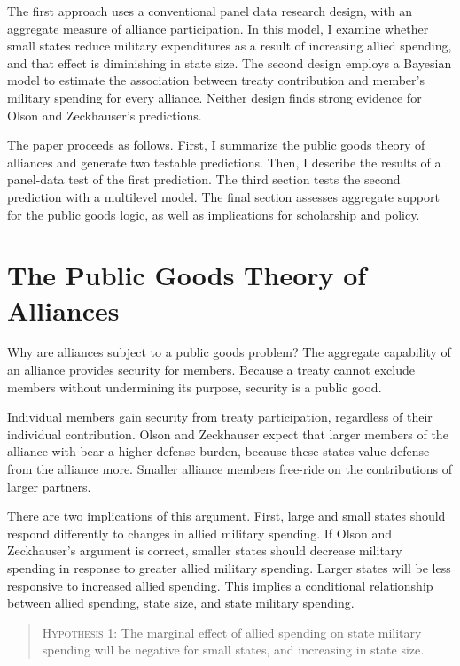 \documentclass[12pt]{article}
\begin{document}
The first approach uses a conventional panel data research design, with an aggregate measure of alliance participation. 
In this model, I examine whether small states reduce military expenditures as a result of increasing allied spending, and that effect is diminishing in state size. 
The second design employs a Bayesian model to estimate the association between treaty contribution and member's military spending for every alliance. 
Neither design finds strong evidence for Olson and Zeckhauser's predictions. 


The paper proceeds as follows.
First, I summarize the public goods theory of alliances and generate two testable predictions.
Then, I describe the results of a panel-data test of the first prediction.
The third section tests the second prediction with a multilevel model. 
The final section assesses aggregate support for the public goods logic, as well as implications for scholarship and policy. 


\section{The Public Goods Theory of Alliances}


Why are alliances subject to a public goods problem? 
The aggregate capability of an alliance provides security for members. 
Because a treaty cannot exclude members without undermining its purpose, security is a public good. 


Individual members gain security from treaty participation, regardless of their individual contribution. 
Olson and Zeckhauser expect that larger members of the alliance with bear a higher defense burden, because these states value defense from the alliance more. 
Smaller alliance members free-ride on the contributions of larger partners. 


There are two implications of this argument. 
First, large and small states should respond differently to changes in allied military spending. 
If Olson and Zeckhauser's argument is correct, smaller states should decrease military spending in response to greater allied military spending. 
Larger states will be less responsive to increased allied spending. 
This implies a conditional relationship between allied spending, state size, and state military spending. 


\begin{quote}
\textsc{Hypothesis 1}: The marginal effect of allied spending on state military spending will be negative for small states, and increasing in state size. 
\end{quote}
\end{document}
